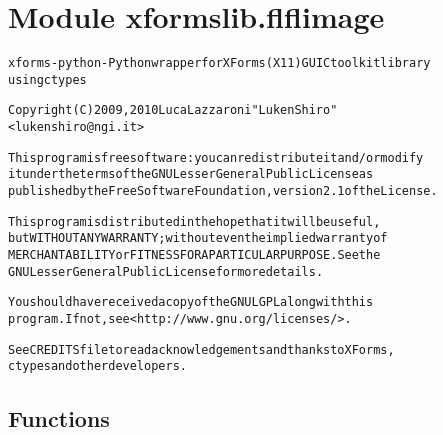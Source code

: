 %
%
%


\section{Module xformslib.flflimage}

    \label{xformslib:flflimage}
\begin{alltt}

xforms-python - Python wrapper for XForms (X11) GUI C toolkit library
using ctypes

Copyright (C) 2009, 2010  Luca Lazzaroni "LukenShiro"
    {\textless}lukenshiro@ngi.it{\textgreater}

This program is free software: you can redistribute it and/or modify
it under the terms of the GNU Lesser General Public License as
published by the Free Software Foundation, version 2.1 of the License.

This program is distributed in the hope that it will be useful,
but WITHOUT ANY WARRANTY; without even the implied warranty of
MERCHANTABILITY or FITNESS FOR A PARTICULAR PURPOSE. See the
GNU Lesser General Public License for more details.

You should have received a copy of the GNU LGPL along with this
program. If not, see {\textless}http://www.gnu.org/licenses/{\textgreater}.

See CREDITS file to read acknowledgements and thanks to XForms,
ctypes and other developers.
\end{alltt}



  \subsection{Functions}

    \label{xformslib:flflimage:FL_RGB2GRAY}

